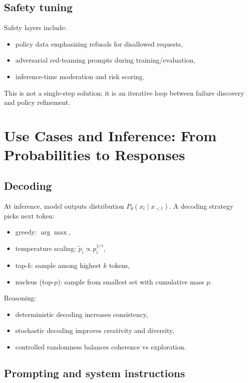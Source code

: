 \documentclass[12pt]{article}
\begin{document}
\subsection{Safety tuning}

Safety layers include:
\begin{itemize}
    \item policy data emphasizing refusals for disallowed requests,
    \item adversarial red-teaming prompts during training/evaluation,
    \item inference-time moderation and risk scoring.
\end{itemize}
This is not a single-step solution; it is an iterative loop between failure discovery and policy refinement.

\section{Use Cases and Inference: From Probabilities to Responses}

\subsection{Decoding}

At inference, model outputs distribution \(P_\theta(x_t\mid x_{<t})\). A decoding strategy picks next token:
\begin{itemize}
    \item greedy: \(\arg\max\),
    \item temperature scaling: \(\tilde{p}_i \propto p_i^{1/\tau}\),
    \item top-\(k\): sample among highest \(k\) tokens,
    \item nucleus (top-\(p\)): sample from smallest set with cumulative mass \(p\).
\end{itemize}
Reasoning:
\begin{itemize}
    \item deterministic decoding increases consistency,
    \item stochastic decoding improves creativity and diversity,
    \item controlled randomness balances coherence vs exploration.
\end{itemize}

\subsection{Prompting and system instructions}
\end{document}
